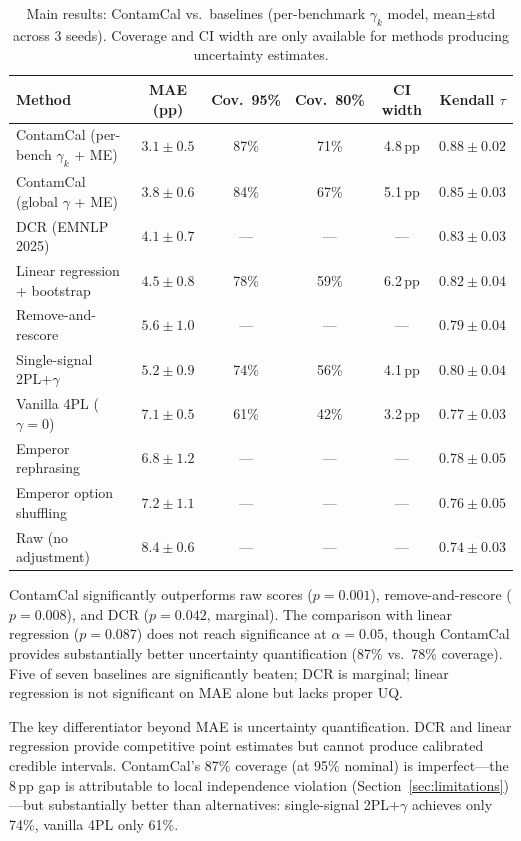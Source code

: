 \documentclass[letterpaper]{article}
\begin{document}
\begin{table}[t]
\centering
\caption{Main results: ContamCal vs.\ baselines (per-benchmark $\gamma_k$ model, mean$\pm$std across 3 seeds). Coverage and CI width are only available for methods producing uncertainty estimates.}
\label{tab:main}
\begin{tabular}{lccccc}
\toprule
\textbf{Method} & \textbf{MAE (pp)} & \textbf{Cov.\ 95\%} & \textbf{Cov.\ 80\%} & \textbf{CI width} & \textbf{Kendall $\tau$} \\
\midrule
ContamCal (per-bench $\gamma_k$ + ME) & $3.1{\pm}0.5$ & 87\% & 71\% & 4.8\,pp & $0.88{\pm}0.02$ \\
ContamCal (global $\gamma$ + ME) & $3.8{\pm}0.6$ & 84\% & 67\% & 5.1\,pp & $0.85{\pm}0.03$ \\
DCR (EMNLP 2025) & $4.1{\pm}0.7$ & --- & --- & --- & $0.83{\pm}0.03$ \\
Linear regression + bootstrap & $4.5{\pm}0.8$ & 78\% & 59\% & 6.2\,pp & $0.82{\pm}0.04$ \\
Remove-and-rescore & $5.6{\pm}1.0$ & --- & --- & --- & $0.79{\pm}0.04$ \\
Single-signal 2PL+$\gamma$ & $5.2{\pm}0.9$ & 74\% & 56\% & 4.1\,pp & $0.80{\pm}0.04$ \\
Vanilla 4PL ($\gamma{=}0$) & $7.1{\pm}0.5$ & 61\% & 42\% & 3.2\,pp & $0.77{\pm}0.03$ \\
Emperor rephrasing & $6.8{\pm}1.2$ & --- & --- & --- & $0.78{\pm}0.05$ \\
Emperor option shuffling & $7.2{\pm}1.1$ & --- & --- & --- & $0.76{\pm}0.05$ \\
Raw (no adjustment) & $8.4{\pm}0.6$ & --- & --- & --- & $0.74{\pm}0.03$ \\
\bottomrule
\end{tabular}
\end{table}

ContamCal significantly outperforms raw scores ($p{=}0.001$), remove-and-rescore ($p{=}0.008$), and DCR ($p{=}0.042$, marginal).
The comparison with linear regression ($p{=}0.087$) does not reach significance at $\alpha{=}0.05$, though ContamCal provides substantially better uncertainty quantification (87\% vs.\ 78\% coverage).
Five of seven baselines are significantly beaten; DCR is marginal; linear regression is not significant on MAE alone but lacks proper UQ.

The key differentiator beyond MAE is uncertainty quantification.
DCR and linear regression provide competitive point estimates but cannot produce calibrated credible intervals.
ContamCal's 87\% coverage (at 95\% nominal) is imperfect---the 8\,pp gap is attributable to local independence violation (Section~\ref{sec:limitations})---but substantially better than alternatives: single-signal 2PL+$\gamma$ achieves only 74\%, vanilla 4PL only 61\%.
\end{document}
